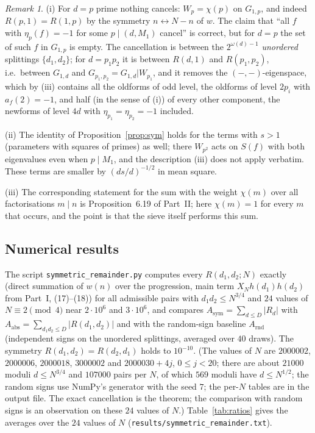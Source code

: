 \documentclass[11pt,a4paper]{article}
\theoremstyle{remark}
\newtheorem{remark}[theorem]{Remark}
\theoremstyle{definition}
\begin{document}
\begin{remark}
(i) For $d=p$ prime nothing cancels: $W_p=\chi(p)$ on $G_{1,p}$, and indeed $R(p,1)=R(1,p)$ by the symmetry $n\leftrightarrow N-n$ of $w$. The claim that ``all $f$ with $\eta_p(f)=-1$ for some $p\mid(d,M_1)$ cancel'' is correct, but for $d=p$ the set of such $f$ in $G_{1,p}$ is empty. The cancellation is between the $2^{\omega(d)-1}$ \emph{unordered} splittings $\{d_1,d_2\}$; for $d=p_1p_2$ it is between $R(d,1)$ and $R(p_1,p_2)$, i.e.\ between $G_{1,d}$ and $G_{p_1,p_2}=G_{1,d}|W_{p_1}$, and it removes the $(-,-)$-eigenspace, which by (iii) contains all the oldforms of odd level, the oldforms of level $2p_i$ with $a_f(2)=-1$, and half (in the sense of (i)) of every other component, the newforms of level $4d$ with $\eta_{p_1}=\eta_{p_2}=-1$ included.

(ii) The identity of Proposition~\ref{prop:sym} holds for the terms with $s>1$ (parameters with squares of primes) as well; there $W_{p^2}$ acts on $S(f)$ with both eigenvalues even when $p\mid M_1$, and the description (iii) does not apply verbatim. These terms are smaller by $(ds/d)^{-1/2}$ in mean square.

(iii) The corresponding statement for the sum with the weight $\chi(m)$ over all factorisations $m\mid n$ is Proposition~6.19 of Part~II; here $\chi(m)=1$ for every $m$ that occurs, and the point is that the sieve itself performs this sum.
\end{remark}

\subsection{Numerical results}
The script \texttt{symmetric\_remainder.py} computes every $R(d_1,d_2;N)$ exactly (direct summation of $w(n)$ over the progression, main term $X_Nh(d_1)h(d_2)$ from Part~I, (17)--(18)) for all admissible pairs with $d_1d_2\le N^{3/4}$ and $24$ values of $N\equiv2\pmod4$ near $2\cdot10^6$ and $3\cdot10^6$, and compares $A_{\mathrm{sym}}=\sum_{d\le D}|R_d|$ with $A_{\mathrm{abs}}=\sum_{d_1d_2\le D}|R(d_1,d_2)|$ and with the random-sign baseline $A_{\mathrm{rnd}}$ (independent signs on the unordered splittings, averaged over $40$ draws). The symmetry $R(d_1,d_2)=R(d_2,d_1)$ holds to $10^{-10}$. (The values of $N$ are $2000002$, $2000006$, $2000018$, $3000002$ and $2000030+4j$, $0\le j<20$; there are about $21000$ moduli $d\le N^{3/4}$ and $107000$ pairs per $N$, of which $569$ moduli have $d\le N^{1/2}$; the random signs use NumPy's generator with the seed $7$; the per-$N$ tables are in the output file. The exact cancellation is the theorem; the comparison with random signs is an observation on these $24$ values of $N$.) Table~\ref{tab:ratios} gives the averages over the $24$ values of $N$ (\texttt{results/symmetric\_remainder.txt}).
\end{document}
